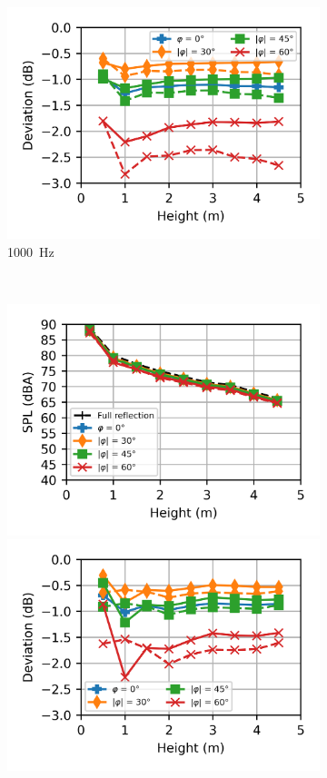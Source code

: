 \begin{figure}
\begin{subfigure}[b]{\textwidth}
		\hfill
		\includegraphics{fig/chap5/impedance/third_octave/deviation_1000_Hz.png}
		\caption{\SI{1000}{\hertz}}
	\end{subfigure}
	\\
	\begin{subfigure}[b]{\textwidth}
		\centering
		\includegraphics{fig/chap5/impedance/third_octave/SPL_2000_Hz.png}
		\hfill
		\includegraphics{fig/chap5/impedance/third_octave/deviation_2000_Hz.png}

\end{subfigure}
\end{figure}
